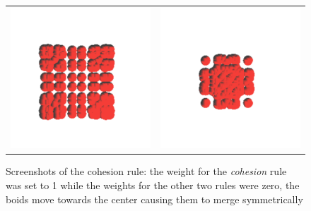 \begin{figure}[htbp]
\begin{center}
\begin{tabular}{cc}
\includegraphics[scale= 0.5]{figures/coh3.pdf} &
\includegraphics[scale= 0.5]{figures/coh4.pdf}
\end{tabular}
\end{center}
\caption{Screenshots of the cohesion rule: the weight for the \textit{cohesion} rule was set to 1 while the weights for the other two rules were zero, the boids move towards the center causing them to merge symmetrically}
\label{cohRule}
\end{figure}

